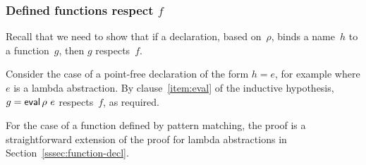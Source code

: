 
\subsubsection{Defined functions respect $f$}

Recall that we need to show that if a declaration, based on~$\rho$, binds a
name~$h$ to a function~$g$, then $g$ respects~$f$.

Consider the case of a point-free declaration of the form $h = e$, for example
where $e$ is a lambda abstraction.  By clause~\ref{item:eval} of the inductive
hypothesis, $g = \mathop{\sf eval} \rho~e$ respects~$f$, as required.


For the case of a function defined by pattern matching, the proof is a
straightforward extension of the proof for lambda abstractions in
Section~\ref{sssec:function-decl}.



